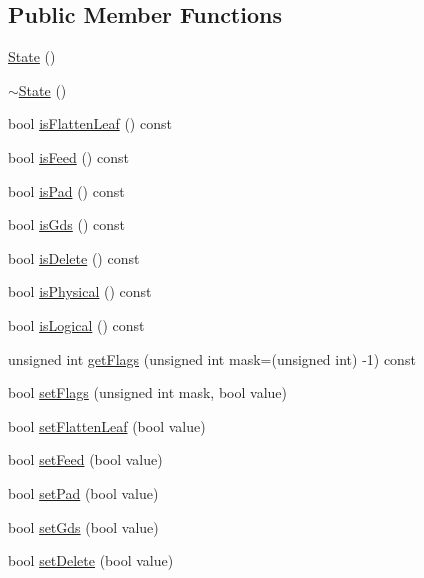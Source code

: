 \subsection*{Public Member Functions}
\begin{DoxyCompactItemize}
\item 
\hyperlink{classCRL_1_1Catalog_1_1State_a97e69ca85c09942e20d41013b8ff5280}{State} ()
\item 
\hyperlink{classCRL_1_1Catalog_1_1State_ae25003eae8262a994fba979f28c35aed}{$\sim$\+State} ()
\item 
bool \hyperlink{classCRL_1_1Catalog_1_1State_a14f0d3b8c2e62ad51c78cb8cac4ebbf6}{is\+Flatten\+Leaf} () const
\item 
bool \hyperlink{classCRL_1_1Catalog_1_1State_a53c89121d49a7fc9f8a09093a35d32c4}{is\+Feed} () const
\item 
bool \hyperlink{classCRL_1_1Catalog_1_1State_a457e8dcf1928e6df40ec9f686350c2d0}{is\+Pad} () const
\item 
bool \hyperlink{classCRL_1_1Catalog_1_1State_a7af8d732bf9cea0b0ddb4eca3b0528ec}{is\+Gds} () const
\item 
bool \hyperlink{classCRL_1_1Catalog_1_1State_ac6df038ecb133b973f9b9f2a5e858ca5}{is\+Delete} () const
\item 
bool \hyperlink{classCRL_1_1Catalog_1_1State_a72b60d86f25221fd8fe7a5902be528a2}{is\+Physical} () const
\item 
bool \hyperlink{classCRL_1_1Catalog_1_1State_a07aad28830a57090cf9203b0ff8714b1}{is\+Logical} () const
\item 
unsigned int \hyperlink{classCRL_1_1Catalog_1_1State_a80ac3efddd043ec7151680755cc3db42}{get\+Flags} (unsigned int mask=(unsigned int) -\/1) const
\item 
bool \hyperlink{classCRL_1_1Catalog_1_1State_a73a3866e9da359611638b2d725a79613}{set\+Flags} (unsigned int mask, bool value)
\item 
bool \hyperlink{classCRL_1_1Catalog_1_1State_a4fba9a5ea27f5a36e41f0246124a3095}{set\+Flatten\+Leaf} (bool value)
\item 
bool \hyperlink{classCRL_1_1Catalog_1_1State_ab5936e80369947177be88c3d770f4725}{set\+Feed} (bool value)
\item 
bool \hyperlink{classCRL_1_1Catalog_1_1State_a97e2158809ed0e88237bb92eb8daa290}{set\+Pad} (bool value)
\item 
bool \hyperlink{classCRL_1_1Catalog_1_1State_acc0c819f382393dc780bb19c7788b216}{set\+Gds} (bool value)
\item 
bool \hyperlink{classCRL_1_1Catalog_1_1State_a53873a1a42083389dfae02b46b3f2de3}{set\+Delete} (bool value)

\end{DoxyCompactItemize}
